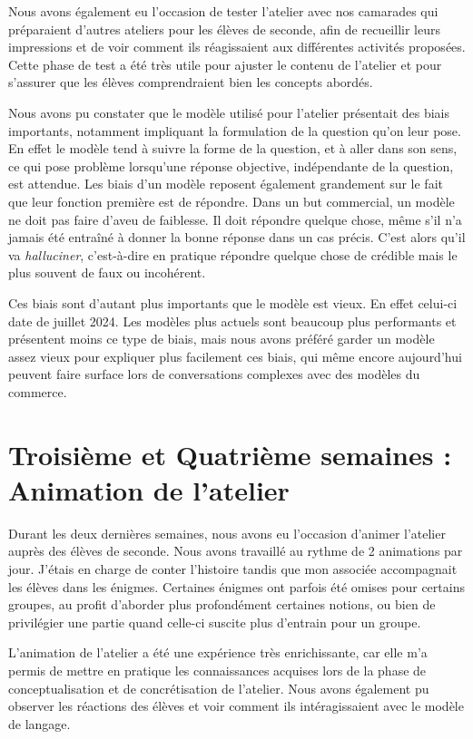   Nous avons également eu l'occasion de tester l'atelier avec nos camarades qui préparaient d'autres ateliers pour les élèves de seconde, afin de recueillir leurs impressions et de voir comment ils réagissaient aux différentes activités proposées. Cette phase de test a été très utile pour ajuster le contenu de l'atelier et pour s'assurer que les élèves comprendraient bien les concepts abordés. \par 
Nous avons pu constater que le modèle utilisé pour l'atelier présentait des biais importants, notamment impliquant la formulation de la question qu'on leur pose. En effet le modèle tend à suivre la forme de la question, et à aller dans son sens, ce qui pose problème lorsqu'une réponse objective, indépendante de la question, est attendue. Les biais d'un modèle reposent également grandement sur le fait que leur fonction première est de répondre. Dans un but commercial, un modèle ne doit pas faire d'aveu de faiblesse. Il doit répondre quelque chose, même s'il n'a jamais été entraîné à donner la bonne réponse dans un cas précis. C'est alors qu'il va \textit{halluciner}, c'est-à-dire en pratique répondre quelque chose de crédible mais le plus souvent de faux ou incohérent. \par
Ces biais sont d'autant plus importants que le modèle est vieux. En effet celui-ci date de juillet 2024. Les modèles plus actuels sont beaucoup plus performants et présentent moins ce type de biais, mais nous avons préféré garder un modèle assez vieux pour expliquer plus facilement ces biais, qui même encore aujourd'hui peuvent faire surface lors de conversations complexes avec des modèles du commerce.\par

\section{Troisième et Quatrième semaines : Animation de l'atelier}

  Durant les deux dernières semaines, nous avons eu l'occasion d'animer l'atelier auprès des élèves de seconde.
Nous avons travaillé au rythme de 2 animations par jour. J'étais en charge de conter l'histoire tandis que mon associée accompagnait les élèves dans les énigmes. Certaines énigmes ont parfois été omises pour certains groupes, au profit d'aborder plus profondément certaines notions, ou bien de privilégier une partie quand celle-ci suscite plus d'entrain pour un groupe. \par
  L'animation de l'atelier a été une expérience très enrichissante, car elle m'a permis de mettre en pratique les connaissances acquises lors de la phase de conceptualisation et de concrétisation de l'atelier. Nous avons également pu observer les réactions des élèves et voir comment ils intéragissaient avec le modèle de langage.
